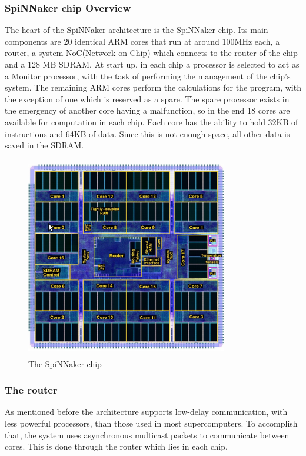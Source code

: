 \documentclass[12pt,twosided]{article}
\begin{document}
\subsubsection {SpiNNaker chip Overview}
The heart of the SpiNNaker architecture is the SpiNNaker chip. Its main components are 20 identical ARM cores that run at around 100MHz each, a router, a system NoC(Network-on-Chip) which connects to the router of the chip and a 128 MB SDRAM. At start up, in each chip a processor is selected to act as a Monitor processor, with the task of performing the management of the chip's system. The remaining ARM cores perform the calculations for the program, with the exception of one which is reserved as a spare. The spare processor exists in the emergency of another core having a malfunction, so in the end 18 cores are available for computation in each chip\cite{furber2007neural}. Each core has the ability to hold 32KB of instructions and 64KB of data. Since this is not enough space, all other data is saved in the SDRAM\cite{navaridas2009understanding}.
\begin{figure}[h!]
\includegraphics[width=250pt,height=250pt,scale=2]{Pics/chip.png}
\centering
\caption{The SpiNNaker chip\cite{spinnweb}}
\end{figure}
\subsubsection{The router}
As mentioned before the architecture supports low-delay communication, with less powerful processors, than those used in most supercomputers. To accomplish that, the system uses asynchronous multicast packets to communicate between cores. This is done through the router which lies in each chip.
\end{document}
